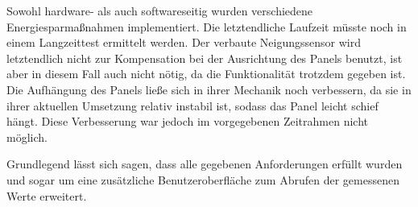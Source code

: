 Sowohl hardware- als auch softwareseitig wurden verschiedene Energiesparmaßnahmen implementiert. Die letztendliche Laufzeit müsste noch in einem Langzeittest ermittelt werden. Der verbaute Neigungssensor wird letztendlich nicht zur Kompensation bei der Ausrichtung des Panels benutzt, ist aber in diesem Fall auch nicht nötig, da die Funktionalität trotzdem gegeben ist. Die Aufhängung des Panels ließe sich in ihrer Mechanik noch verbessern, da sie in ihrer aktuellen Umsetzung relativ instabil ist, sodass das Panel leicht schief hängt. Diese Verbesserung war jedoch im vorgegebenen Zeitrahmen nicht möglich.

Grundlegend lässt sich sagen, dass alle gegebenen Anforderungen erfüllt wurden und sogar um eine zusätzliche Benutzeroberfläche zum Abrufen der gemessenen Werte erweitert.



